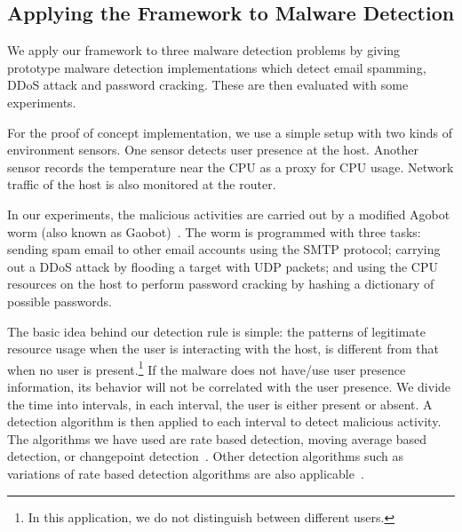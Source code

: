 \subsection{Applying the Framework to Malware Detection} \label{sec:app-malware}

We apply our framework to three malware detection problems
by giving prototype malware detection implementations which
detect email spamming, DDoS attack and password cracking.
These are then evaluated with some experiments.

For the proof of concept implementation, we use
a simple setup with two kinds of environment sensors.
One sensor detects user presence at the host.
Another sensor records the temperature near the CPU as a proxy
for CPU usage.
Network traffic of the host is also monitored at the router.

In our experiments, the malicious activities are carried out by a
modified Agobot worm (also known as Gaobot)~\cite{Agobot}.
The worm is programmed with three tasks:
sending spam email to other email accounts using the SMTP protocol; 
carrying out a DDoS attack by flooding a target with UDP packets; 
and using the CPU resources on the host to perform password
cracking by hashing a dictionary of possible passwords.

The basic idea behind our detection rule is simple: the patterns of
legitimate resource usage when the user is  interacting with the
host, is different from that when no user is present.\footnote{
In this application, we do not distinguish between different users.
}
If the malware does not have/use user presence information, 
its behavior will not be correlated with the user presence. 
We divide the time into
intervals, in each interval, the user is either present or absent.
A detection algorithm is then applied to each interval to detect
malicious activity. The algorithms we have used are rate based detection,
moving average based detection, or changepoint
detection~\cite{wangInfocom02,ChangpointBook93}. 
Other detection algorithms such as 
variations of rate based detection algorithms are also applicable~\cite{chandola09}.
